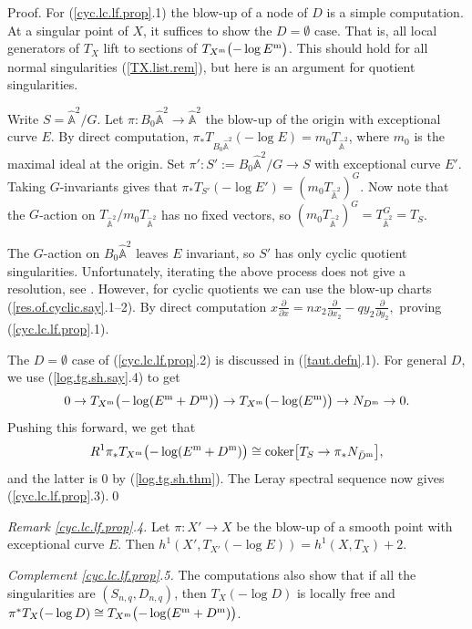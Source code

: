 \documentclass{amsart}
\theoremstyle{definition}
\theoremstyle{remark}
\renewcommand{\a}[0]{\hat{\mathbb A}}
\newcommand{\coker}[0]{\operatorname{coker}}
\begin{document}
  
  

   
 Proof.
 For (\ref{cyc.lc.lf.prop}.1) the 
 blow-up of a node of $D$ is a simple computation.
At a  singular point of $X$, 
 it suffices to show the $D=\emptyset$ case. That is,  all local generators of
   $T_X$  lift to sections of
 $T_{X^{\rm m}}\bigl(-\log E^{\rm m}\bigr)$.  
 This should hold for all normal singularities (\ref{TX.list.rem}), but here is an argument for quotient  singularities.


 Write $S=\a^2/G$. Let $\pi:B_0\a^2\to \a^2$ the blow-up of the origin with  exceptional curve $E$. By direct computation,
 $\pi_*T_{B_0\a^2}(-\log E)= m_0T_{\a^2}$,
 where $m_0$ is the maximal ideal at the origin.
Set $\pi':S':=B_0\a^2/G\to S$ with  exceptional curve $E'$.
 Taking $G$-invariants gives that
$\pi_*T_{S'}(-\log E')= (m_0T_{\a^2})^G$.
 Now note that the $G$-action on $T_{\a^2}/m_0T_{\a^2}$ has no fixed vectors,
 so $(m_0T_{\a^2})^G=T_{\a^2}^G=T_S$.

 The $G$-action on $B_0\a^2$ leaves $E$ invariant, so 
 $S'$ has only cyclic quotient singularities.
 Unfortunately, iterating  the above process does not give a resolution, see \cite[2.29]{k-res}. However, for cyclic quotients we can use the blow-up charts
(\ref{res.of.cyclic.say}.1--2).  By  direct computation
   $
   x\tfrac{\partial}{\partial x}=
   nx_2\tfrac{\partial}{\partial x_2}-q y_2\tfrac{\partial}{\partial y_2},
   $
   proving (\ref{cyc.lc.lf.prop}.1).

The $D=\emptyset$ case of 
(\ref{cyc.lc.lf.prop}.2)  is discussed in (\ref{taut.defn}.1).
For general $D$, we use (\ref{log.tg.sh.say}.4) to get
$$
0\to  T_{X^{\rm m}}\bigl(-\log (E^{\rm m}+D^{\rm m})\bigr)
\to  T_{X^{\rm m}}\bigl(-\log (E^{\rm m})\bigr)
\to  N_{D^{\rm m}}\to 0.
$$
Pushing this forward, we get that
$$
R^1\pi_*T_{X^{\rm m}}\bigl(-\log (E^{\rm m}+D^{\rm m})\bigr)\cong
\coker\bigl[T_S\to \pi_*N_{\bar D^{\rm m}}\bigr],
$$
  and the latter is 0 by (\ref{log.tg.sh.thm}).
   The Leray spectral sequence now gives (\ref{cyc.lc.lf.prop}.3).\qed



   \medskip
       {\it Remark \ref{cyc.lc.lf.prop}.4.}   Let $\pi:X'\to X$ be the blow-up of a smooth point with exceptional curve $E$. Then
       $h^1(X', T_{X'}(-\log E))=h^1(X, T_X)+2$.
       
   \medskip
{\it Complement \ref{cyc.lc.lf.prop}.5.}  The computations also show that if all the singularities are 
$(S_{n,q}, D_{n,q})$, then  $T_X(-\log D)$ is locally free
and $\pi^*T_X(-\log D)\cong  T_{X^{\rm m}}\bigl(-\log (E^{\rm m}+D^{\rm m})\bigr)$.
\end{document}
